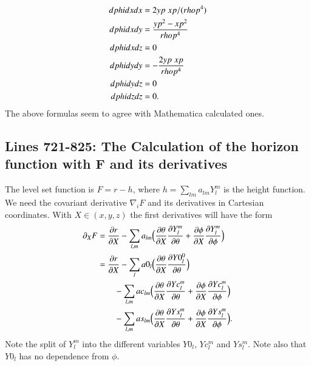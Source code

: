 \documentclass[11pt,a4paper,twoside]{article}
\begin{document}
\begin{align}
  dphidxdx &= 2 yp \;xp/(rhop^4)           \notag\\
  dphidxdy &= \frac {yp^2-xp^2} {rhop^4} \notag\\
  dphidxdz &= 0                          \\
  dphidydy &= - \frac {2 yp\; xp}{rhop^4}  \notag\\
  dphidydz &= 0                          \notag\\
  dphidzdz &= 0.
\end{align}
The above formulas seem to agree with Mathematica calculated ones.

\subsection{Lines 721-825: The Calculation of the horizon function 
            with F and its derivatives}
The level set function is $F=r-h$, where $h=\sum_{lm} a_{lm} Y_l^m$ is the 
height function. We need the covariant derivative $\nabla_i F$ and its 
derivatives in Cartesian coordinates. With $X \in (x,y,z)$ the first derivatives
will have the form
\begin{align}
  \partial_X F &= \frac {\partial r}{\partial X}
       - \sum_{l,m} a_{lm} \Big( \frac {\partial \theta} {\partial X}
                                 \frac {\partial Y_l^m} {\partial \theta}
                              +  \frac {\partial \phi}  {\partial X}
                                 \frac {\partial Y_l^m} {\partial \phi}
                               \Big)\\
     &= \frac {\partial r}{\partial X} 
       -\sum_{l} a0_{l} \Big( \frac {\partial \theta} {\partial X}
                                 \frac {\partial Y0_l^0} {\partial \theta}
                               \Big)\notag\\
     &\qquad - \sum_{l,m} ac_{lm} \Big( \frac {\partial \theta} {\partial X}
                                 \frac {\partial Yc_l^m} {\partial \theta}
                              +  \frac {\partial \phi}  {\partial X}
                                 \frac {\partial Yc_l^m} {\partial \phi}
                               \Big)\notag \\
     &\qquad - \sum_{l,m} as_{lm} \Big( \frac {\partial \theta} {\partial X}
                                 \frac {\partial Ys_l^m} {\partial \theta}
                              +  \frac {\partial \phi}  {\partial X}
                                 \frac {\partial Ys_l^m} {\partial \phi}
                               \Big).
\end{align}
Note the split of $Y_l^m$ into the different
variables $Y0_l$, $Yc_l^m$ and $Ys_l^m$. 
Note also that $Y0_l$ has no dependence from $\phi$.
\end{document}
